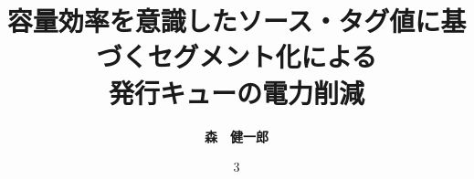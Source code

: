 

\pagestyle{headings}

\graphicspath{{figure/}}



\newcommand{\fig}[1]{{図~\ref{fig:#1}}}
\newcommand{\subfig}[2]{{図~\ref{fig:#1}}~{(\subref{fig:#2})}}
\newcommand{\tab}[1]{{表~\ref{tab:#1}}}
\newcommand{\refchap}[1]{第{\ref{sec:#1}~章}}
\newcommand{\refsec}[1]{{\ref{sec:#1}~節}}



\title{\bf 容量効率を意識したソース・タグ値に基づくセグメント化による \\
発行キューの電力削減}
\author{\bf 森　健一郎}
\date{3} %

\minfotitle   %



{ 

  \setlength{\baselineskip}{2.2em}
  
}

\tableofcontents

\clearpage 
{}

\setlength{\baselineskip}{2.2em}






% 



% 





 



